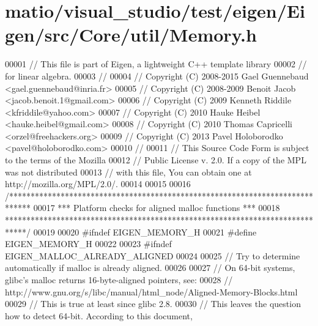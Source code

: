 \hypertarget{matio_2visual__studio_2test_2eigen_2_eigen_2src_2_core_2util_2_memory_8h_source}{}\section{matio/visual\+\_\+studio/test/eigen/\+Eigen/src/\+Core/util/\+Memory.h}
\label{matio_2visual__studio_2test_2eigen_2_eigen_2src_2_core_2util_2_memory_8h_source}

\begin{DoxyCode}
00001 \textcolor{comment}{// This file is part of Eigen, a lightweight C++ template library}
00002 \textcolor{comment}{// for linear algebra.}
00003 \textcolor{comment}{//}
00004 \textcolor{comment}{// Copyright (C) 2008-2015 Gael Guennebaud <gael.guennebaud@inria.fr>}
00005 \textcolor{comment}{// Copyright (C) 2008-2009 Benoit Jacob <jacob.benoit.1@gmail.com>}
00006 \textcolor{comment}{// Copyright (C) 2009 Kenneth Riddile <kfriddile@yahoo.com>}
00007 \textcolor{comment}{// Copyright (C) 2010 Hauke Heibel <hauke.heibel@gmail.com>}
00008 \textcolor{comment}{// Copyright (C) 2010 Thomas Capricelli <orzel@freehackers.org>}
00009 \textcolor{comment}{// Copyright (C) 2013 Pavel Holoborodko <pavel@holoborodko.com>}
00010 \textcolor{comment}{//}
00011 \textcolor{comment}{// This Source Code Form is subject to the terms of the Mozilla}
00012 \textcolor{comment}{// Public License v. 2.0. If a copy of the MPL was not distributed}
00013 \textcolor{comment}{// with this file, You can obtain one at http://mozilla.org/MPL/2.0/.}
00014 
00015 
00016 \textcolor{comment}{/*****************************************************************************}
00017 \textcolor{comment}{*** Platform checks for aligned malloc functions                           ***}
00018 \textcolor{comment}{*****************************************************************************/}
00019 
00020 \textcolor{preprocessor}{#ifndef EIGEN\_MEMORY\_H}
00021 \textcolor{preprocessor}{#define EIGEN\_MEMORY\_H}
00022 
00023 \textcolor{preprocessor}{#ifndef EIGEN\_MALLOC\_ALREADY\_ALIGNED}
00024 
00025 \textcolor{comment}{// Try to determine automatically if malloc is already aligned.}
00026 
00027 \textcolor{comment}{// On 64-bit systems, glibc's malloc returns 16-byte-aligned pointers, see:}
00028 \textcolor{comment}{//   http://www.gnu.org/s/libc/manual/html\_node/Aligned-Memory-Blocks.html}
00029 \textcolor{comment}{// This is true at least since glibc 2.8.}
00030 \textcolor{comment}{// This leaves the question how to detect 64-bit. According to this document,}

\end{DoxyCode}
